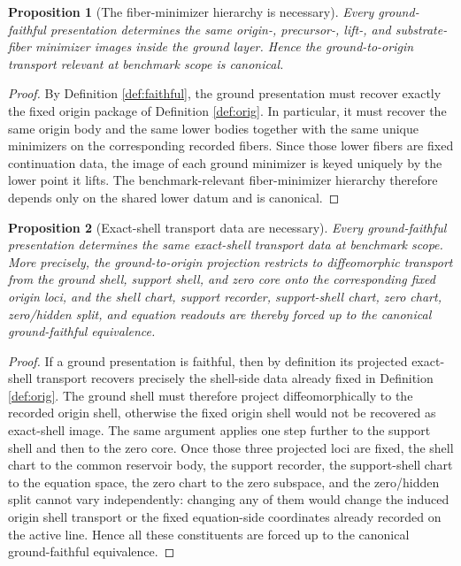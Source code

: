 \documentclass[11pt]{article}
\newtheorem{proposition}{Proposition}
\begin{document}
\begin{proposition}[The fiber-minimizer hierarchy is necessary]
\label{prop:minimizers}
Every ground-faithful presentation determines the same origin-, precursor-, lift-, and substrate-fiber minimizer images inside the ground layer. Hence the ground-to-origin transport relevant at benchmark scope is canonical.
\end{proposition}

\begin{proof}
By Definition \ref{def:faithful}, the ground presentation must recover exactly the fixed origin package of Definition \ref{def:orig}. In particular, it must recover the same origin body and the same lower bodies together with the same unique minimizers on the corresponding recorded fibers. Since those lower fibers are fixed continuation data, the image of each ground minimizer is keyed uniquely by the lower point it lifts. The benchmark-relevant fiber-minimizer hierarchy therefore depends only on the shared lower datum and is canonical.
\end{proof}

\begin{proposition}[Exact-shell transport data are necessary]
\label{prop:shell}
Every ground-faithful presentation determines the same exact-shell transport data at benchmark scope. More precisely, the ground-to-origin projection restricts to diffeomorphic transport from the ground shell, support shell, and zero core onto the corresponding fixed origin loci, and the shell chart, support recorder, support-shell chart, zero chart, zero/hidden split, and equation readouts are thereby forced up to the canonical ground-faithful equivalence.
\end{proposition}

\begin{proof}
If a ground presentation is faithful, then by definition its projected exact-shell transport recovers precisely the shell-side data already fixed in Definition \ref{def:orig}. The ground shell must therefore project diffeomorphically to the recorded origin shell, otherwise the fixed origin shell would not be recovered as exact-shell image. The same argument applies one step further to the support shell and then to the zero core. Once those three projected loci are fixed, the shell chart to the common reservoir body, the support recorder, the support-shell chart to the equation space, the zero chart to the zero subspace, and the zero/hidden split cannot vary independently: changing any of them would change the induced origin shell transport or the fixed equation-side coordinates already recorded on the active line. Hence all these constituents are forced up to the canonical ground-faithful equivalence.
\end{proof}
\end{document}
